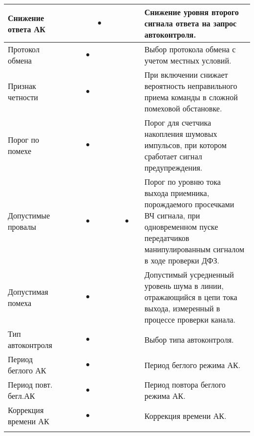 \begin{tabularx}{\linewidth}{| M{4.6cm} |*{9}{p{0.3cm} |} m{5.8cm} |}
	Снижение ответа АК	&   &   &   &   & $\bullet$ &   &   &   &   & Снижение уровня второго сигнала ответа на запрос автоконтроля. \tabularnewline \hline
	Протокол обмена		&   &   &   & $\bullet$ &   &   &   &   &   & Выбор протокола обмена с учетом местных условий. \tabularnewline \hline
	Признак четности	&   &   &   & $\bullet$ &   &   &   &   &   & При включении снижает вероятность неправильного приема команды в сложной помеховой обстановке. \tabularnewline \hline
	Порог по помехе		&   &   &   & $\bullet$ &   &   &   &   &   & Порог для счетчика накопления шумовых импульсов, при котором сработает сигнал предупреждения. \tabularnewline \hline
	Допустимые провалы	&   &   &   & $\bullet$ &   &   &   & $\bullet$ &   & Порог по уровню тока выхода приемника, порождаемого просечками ВЧ сигнала, при одновременном пуске передатчиков манипулированным сигналом в ходе проверки ДФЗ. \tabularnewline \hline
	Допустимая помеха	&   &   &   & $\bullet$ &   &   &   &   &   & Допустимый усредненный уровень шума в линии, отражающийся в цепи тока выхода, измеренный в процессе проверки канала. \tabularnewline \hline
	Тип автоконтроля	&   &   &   & $\bullet$ &   &   &   &   &   & Выбор типа автоконтроля. \tabularnewline \hline
	Период беглого АК	&   &   &   & $\bullet$ &   &   &   &   &   & Период беглого режима АК. \tabularnewline \hline
	Период повт. бегл.АК &   &   &   & $\bullet$ &   &   &   &   &   & Период повтора беглого режима АК. \tabularnewline \hline
	Коррекция времени АК &   &   &   & $\bullet$ &   &   &   &   &   & Коррекция времени АК. \tabularnewline 
	
    \lasthline
\end{tabularx} 